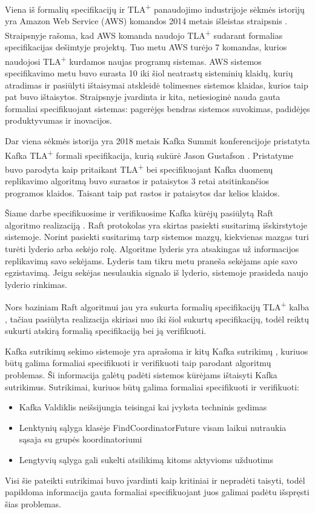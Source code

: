 \documentclass{VUMIFPSmagistrinis}
\begin{document}
		Viena iš formalių specifikacijų ir TLA\textsuperscript{+} panaudojimo industrijoje sėkmės istorijų yra Amazon Web Service (AWS) komandos 2014 metais išleistas straipsnis \cite{newcombe2014use}.
		Straipsnyje rašoma,  kad AWS komanda naudojo TLA\textsuperscript{+} sudarant formalias specifikacijas dešimtyje projektų. Tuo metu AWS turėjo 7 komandas, kurios naudojosi TLA\textsuperscript{+} kurdamos naujas programų sistemas.
		AWS sistemos specifikavimo metu buvo surasta 10 iki šiol neatrastų sisteminių klaidų, kurių atradimas ir pasiūlyti ištaisymai atskleidė tolimesnes sistemos klaidas, kurios taip pat buvo ištaisytos.
		Straipsnyje įvardinta ir kita, netiesioginė nauda gauta formaliai specifikuojant sistemas: pagerėjęs bendras sistemos suvokimas, padidėjęs produktyvumas ir inovacijos.
		

		Dar viena sėkmės istorija yra 2018 metais Kafka Summit konferencijoje pristatyta Kafka TLA\textsuperscript{+} formali specifikacija, kurią sukūrė Jason Gustafson \cite{kfkTla}.
		Pristatyme buvo parodyta kaip pritaikant TLA\textsuperscript{+} bei specifikuojant Kafka duomenų replikavimo algoritmą buvo surastos ir pataisytos 3 retai atsitinkančios programos klaidos.
		Taisant taip pat rastos ir pataisytos dar kelios klaidos.


		Šiame darbe specifikuosime ir verifikuosime Kafka kūrėjų pasiūlytą Raft algoritmo \cite{10.1145/2723872.2723876} realizaciją \cite{raftimpl}.
		Raft protokolas yra skirtas pasiekti susitarimą išskirstytoje sistemoje.
		Norint pasiekti susitarimą tarp sistemos mazgų, kiekvienas mazgas turi turėti lyderio arba sekėjo rolę.
		Algoritme lyderis yra atsakingas už informacijos replikavimą savo sekėjams.
		Lyderis tam tikru metu praneša sekėjams apie savo egzistavimą.
		Jeigu sekėjas nesulaukia signalo iš lyderio, sistemoje prasideda naujo lyderio rinkimas.
		
		
		Nors baziniam Raft algoritmui jau yra sukurta formalių specifikacijų TLA\textsuperscript{+} kalba \cite{rafttla}, tačiau pasiūlyta realizacija skiriasi nuo iki šiol sukurtų specifikacijų, todėl reiktų sukurti atskirą formalią specifikaciją bei ją verifikuoti.


		Kafka sutrikimų sekimo sistemoje yra aprašoma ir kitų Kafka sutrikimų \cite{kfkis} , kuriuos būtų galima formaliai specifikuoti ir verifikuoti taip parodant algoritmų problemas.
		Ši informacija galėtų padėti sistemos kūrėjams ištaisyti Kafka sutrikimus.
		Sutrikimai, kuriuos būtų galima formaliai specifikuoti ir verifikuoti:
		\begin{itemize}
			\item{Kafka Valdiklis neišsijungia teisingai kai įvyksta techninis gedimas \cite{kfkBug}}
			\item{Lenktynių sąlyga klasėje FindCoordinatorFuture visam laikui nutraukia sąsaja su grupės koordinatoriumi \cite{kfkistwo}}
			\item{Lengtyvių sąlyga gali sukelti atsilikimą kitoms aktyvioms užduotims \cite{kfkisthr}}
		\end{itemize}
		Visi šie pateikti sutrikimai buvo įvardinti kaip kritiniai ir nepradėti taisyti, todėl papildoma informacija gauta formaliai specifikuojant juos galimai padėtu išspręsti šias problemas.
\end{document}
